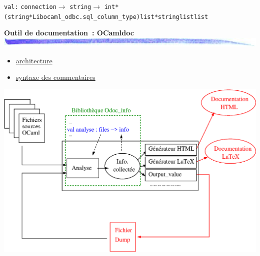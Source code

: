 \documentclass[landscape]{seminar}
\def\title#1#2{\noindent
{\bf\large #1}\\
\includegraphics[width=\textwidth]{bar.jpg.eps}
\vspace{#2cm}
}
\def\target#1{\hypertarget{#1}{}}
\begin{document}
\begin{slide}
{\tt val\hspace{0.2cm}{\bf execute\_with\_info}\hspace{0.2cm}:\hspace{0.2cm}}
{\tt connection\hspace{0.2cm}$\rightarrow$}
{\tt string\hspace{0.2cm}$\rightarrow$}
{\tt int\hspace{0.2cm}*\hspace{0.2cm}(string\hspace{0.2cm}*\hspace{0.2cm}Libocaml\_odbc.sql\_column\_type)\hspace{0.2cm}list\hspace{0.2cm}*\hspace{0.2cm}string\hspace{0.2cm}list\hspace{0.2cm}list}

\end{slide}


\begin{slide}
\title{Outil de documentation~: OCamldoc}{0.5}
\target{ocamldoc}

\begin{itemize}
\item \hyperlink{odoc1}{architecture}
\item \hyperlink{odoc2}{syntaxe des commentaires}
\end{itemize}
\end{slide}


\begin{slide}
\target{odoc1}

\includegraphics[width=\textwidth]{ocamldoc.eps}
\end{slide}
\end{document}

